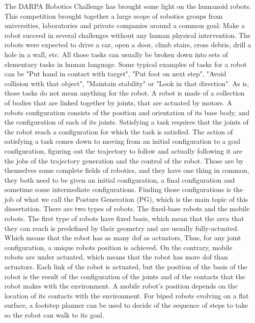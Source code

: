 The DARPA Robotics Challenge has brought some light on the humanoid robots.
This competition brought together a large scope of robotics groups from universities, laboratories and private companies around a common goal: Make a robot succeed in several challenges without any human physical intervention.
The robots were expected to drive a car, open a door, climb stairs, cross debris, drill a hole in a wall, etc.
All those tasks can usually be broken down into sets of elementary tasks in human language.
Some typical examples of tasks for a robot can be "Put hand in contact with target", "Put foot on next step", "Avoid collision with that object", "Maintain stability" or "Look in that direction".
As is, those tasks do not mean anything for the robot.
A robot is made of a collection of bodies that are linked together by joints, that are actuated by motors.
A robots configuration consists of the position and orientation of its base body, and the configuration of each of its joints.
Satisfying a task requires that the joints of the robot reach a configuration for which the task is satisfied.
The action of satisfying a task comes down to moving from an initial configuration to a goal configuration, figuring out the trajectory to follow and actually following it are the jobs of the trajectory generation and the control of the robot.
Those are by themselves some complete fields of robotics, and they have one thing in common, they both need to be given an initial configuration, a final configuration and sometime some intermediate configurations.
Finding those configurations is the job of what we call the Posture Generation (PG), which is the main topic of this dissertation.
There are two types of robots. The fixed-base robots and the mobile robots.
The first type of robots have fixed basis, which mean that the area that they can reach is predefined by their geometry and are usually fully-actuated.
Which means that the robot has as many dof as actuators, Thus, for any joint configuration, a unique robots position is achieved.
On the contrary, mobile robots are under actuated, which means that the robot has more dof than actuators.
Each link of the robot is actuated, but the position of the basis of the robot is the result of the configuration of the joints and of the contacts that the robot makes with the environment.
A mobile robot's position depends on the location of its contacts with the environment.
For biped robots evolving on a flat surface, a footstep planner can be used to decide of the sequence of steps to take so the robot can walk to its goal.

